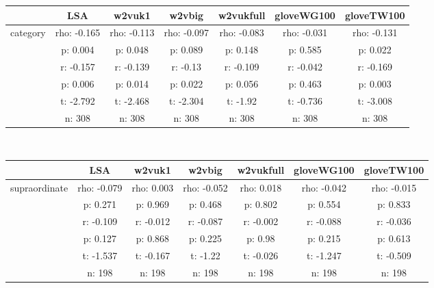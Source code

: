 \documentclass{article}
\begin{document}
\begin{tabular}{ccccccc|}\cline{2-7}
&\multicolumn{1}{|c}{LSA} & w2vuk1 & w2vbig & w2vukfull & gloveWG100 & gloveTW100 \\\hline
\multicolumn{1}{|c|}{\multirow{6}{*}{category}} & rho: -0.165 & rho: -0.113 & rho: -0.097 & rho: -0.083 & rho: -0.031 & rho: -0.131 \\
\multicolumn{1}{|c|}{} & p: 0.004 & p: 0.048 & p: 0.089 & p: 0.148 & p: 0.585 & p: 0.022 \\
\multicolumn{1}{|c|}{} & r: -0.157 & r: -0.139 & r: -0.13 & r: -0.109 & r: -0.042 & r: -0.169 \\
\multicolumn{1}{|c|}{} & p: 0.006 & p: 0.014 & p: 0.022 & p: 0.056 & p: 0.463 & p: 0.003 \\
\multicolumn{1}{|c|}{} & t: -2.792 & t: -2.468 & t: -2.304 & t: -1.92 & t: -0.736 & t: -3.008 \\
\multicolumn{1}{|c|}{} & n: 308 & n: 308 & n: 308 & n: 308 & n: 308 & n: 308 \\
\hline
\end{tabular}\\
\begin{tabular}{ccccccc|}\cline{2-7}
&\multicolumn{1}{|c}{LSA} & w2vuk1 & w2vbig & w2vukfull & gloveWG100 & gloveTW100 \\\hline
\multicolumn{1}{|c|}{\multirow{6}{*}{supraordinate}} & rho: -0.079 & rho: 0.003 & rho: -0.052 & rho: 0.018 & rho: -0.042 & rho: -0.015 \\
\multicolumn{1}{|c|}{} & p: 0.271 & p: 0.969 & p: 0.468 & p: 0.802 & p: 0.554 & p: 0.833 \\
\multicolumn{1}{|c|}{} & r: -0.109 & r: -0.012 & r: -0.087 & r: -0.002 & r: -0.088 & r: -0.036 \\
\multicolumn{1}{|c|}{} & p: 0.127 & p: 0.868 & p: 0.225 & p: 0.98 & p: 0.215 & p: 0.613 \\
\multicolumn{1}{|c|}{} & t: -1.537 & t: -0.167 & t: -1.22 & t: -0.026 & t: -1.247 & t: -0.509 \\
\multicolumn{1}{|c|}{} & n: 198 & n: 198 & n: 198 & n: 198 & n: 198 & n: 198 \\
\hline
\end{tabular}\\
\end{document}

